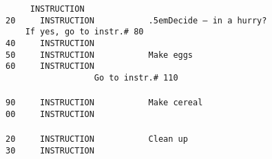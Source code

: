 {\tt{}~~~~~INSTRUCTION\\
20~~~~~INSTRUCTION~~~~~~~~~~~\raise.5em\hbox{Decide -- in a hurry?}\\
~~~~If yes, go to instr.\# 80\\
40~~~~~INSTRUCTION\\
50~~~~~INSTRUCTION~~~~~~~~~~~Make eggs\\
60~~~~~INSTRUCTION\\
~~~~~~~~~~~~~~~~~~Go to instr.\# 110\\
\\
90~~~~~INSTRUCTION~~~~~~~~~~~Make cereal\\
00~~~~~INSTRUCTION\\
\\
20~~~~~INSTRUCTION~~~~~~~~~~~Clean up\\
30~~~~~INSTRUCTION\\
}